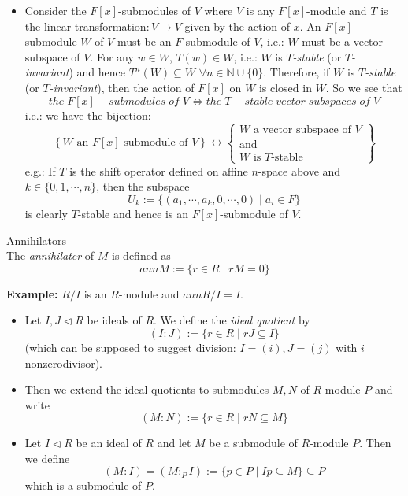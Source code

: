 \begin{itemize}
    \item Consider the $F[x]$-submodules of $V$ where $V$ is any $F[x]$-module and $T$ is the linear transformation$:V \to V$ given by the action of $x$. An $F[x]$-submodule $W$ of $V$ must be an $F$-submodule of $V$, i.e.: $W$ must be a vector subspace of $V$. For any $w \in W$, $T(w) \in W$, i.e.: $W$ is \textit{$T$-stable} (or \textit{$T$-invariant}) and hence $T^n (W) \subseteq W$ $\forall n \in \mathbb{N} \cup \{0\}$. Therefore, if $W$ is \textit{$T$-stable} (or \textit{$T$-invariant}), then the action of $F[x]$ on $W$ is closed in $W$. So we see that
    $$the \; F[x] -submodules\; of\;V \Leftrightarrow the\;T-stable\; vector\;subspaces\; of \;V$$
    i.e.: we have the bijection:
    \[
    \left\{ W \text{ an } F[x]\text{-submodule of }V \right\} \longleftrightarrow 
    \left\{ 
    \begin{matrix}
    W \text{ a vector subspace of } V \\
    \text{and} \\
    W \text{ is } T\text{-stable}
    \end{matrix}
    \right\}
    \]
    e.g.: If $T$ is the shift operator defined on affine $n$-space above and $k \in \{0 ,1 ,\cdots, n\}$, then the subspace
    $$U_k:= \{ (a_1,\cdots, a_k ,0,\cdots, 0) \mid a_i \in F\}$$
    is clearly $T$-stable and hence is an $F[x]$-submodule of $V$.
\end{itemize}













\begin{definition}{Annihilators}\\
The \textit{annihilater} of $M$ is defined as
$$ann M:= \{r\in R \mid rM=0\}$$
\end{definition}

\noindent\textbf{Example:} $R/I$ is an $R$-module and $ann R/I=I$.

\begin{definition}
    \begin{itemize}
        \item Let $I,J \triangleleft R$ be ideals of $R$. We define the \textit{ideal quotient} by
        $$(I:J):= \{r\in R\mid rJ \subseteq I\}$$
        (which can be supposed to suggest division: $I=(i),J=(j)$ with $i$ nonzerodivisor).

        \item Then we extend the ideal quotients to submodules $M,N$ of $R$-module $P$ and write
        $$(M:N) := \{ r\in R \mid rN \subseteq M\}$$

        \item Let $I \triangleleft R$ be an ideal of $R$ and let $M$ be a submodule of $R$-module $P$. Then we define
        $$(M:I) =(M:_PI) := \{p \in P \mid Ip \subseteq M\} \subseteq P$$
        which is a submodule of $P$.
    \end{itemize}
\end{definition}

